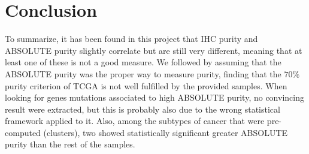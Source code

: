 \documentclass[letterpaper]{article}
\begin{document}
\section{Conclusion}
To summarize, it has been found in this project that IHC purity and ABSOLUTE purity slightly correlate but are still very different, meaning that at least one of these is
not a good measure. We followed by assuming that the ABSOLUTE purity was the proper way to measure purity, finding that the $70\%$ purity criterion of TCGA is not well
fulfilled by the provided samples. When looking for genes mutations associated to high ABSOLUTE purity, no convincing result were extracted, but this is probably also
due to the wrong statistical framework applied to it. Also, among the subtypes of cancer that were pre-computed (clusters), two showed statistically significant greater
ABSOLUTE purity than the rest of the samples.

\newpage
\footnotesize

{}
\end{document}
